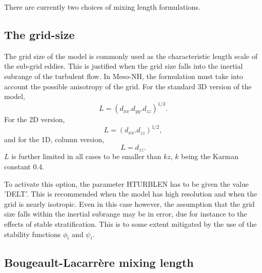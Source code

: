 There are currently two choices of mixing length formulations.

\subsection{The grid-size}

The grid size of the model is commonly used as the characteristic length scale
of the sub-grid eddies.
This is justified when the grid size falls into the inertial subrange of the
turbulent flow.
In Meso-NH, the formulation must take into account the possible anisotropy of
the grid. For the standard 3D version of the model,
\begin{equation}
L= (d_{xx}.d_{yy}.d_{zz})^{1/3}.
\end{equation}
For the 2D version,
\begin{equation}
L= (d_{xx}.d_{zz})^{1/2},
\end{equation}
and for the 1D, column version,
\begin{equation}
L= d_{zz}.
\end{equation}
$L$ is further limited in all cases to be smaller than $kz$, $k$ being the
Karman constant 0.4.


To activate this option, the parameter HTURBLEN
 has to be given the value 'DELT'.
This is recommended when the model has high resolution and when the grid
is nearly isotropic. Even in this case however, the assumption that the grid
size falls within the inertial subrange may be in error, due for instance to
the effects of stable stratification. This is to some extent mitigated by
the use of the stability functions $\phi_i$ and $\psi_i$.

\subsection{Bougeault-Lacarr\`ere mixing length}

